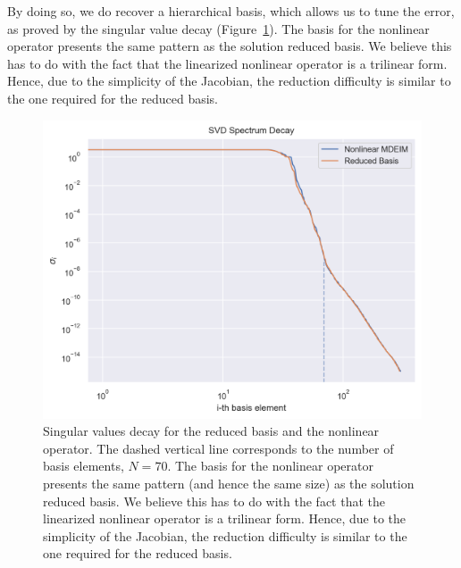 \documentclass[../../thesis.tex]{subfiles}
\begin{document}
By doing so, we do recover a hierarchical basis, which allows us to tune the error,
as proved by the singular value decay (Figure~\ref{fig:sigmas_decay_from_fom}).
The basis for the nonlinear operator presents the same pattern 
as the solution reduced basis.
We believe this has to do with the fact that the linearized nonlinear operator is a trilinear form.
Hence, due to the simplicity of the Jacobian, the reduction difficulty is similar to the one
required for the reduced basis.
\begin{figure}[h]
    \centering
    \includegraphics[width=1\columnwidth]{research_project/piston/figures/mdeim_certification/sigmas_problem_from_fom.png}
    \caption{Singular values decay for the reduced basis and the nonlinear operator.
    The dashed vertical line corresponds to the number of basis elements, $N=70$.
    The basis for the nonlinear operator presents the same pattern 
    (and hence the same size)
    as the solution reduced basis.
    We believe this has to do with the fact that the linearized nonlinear operator is a trilinear form.
    Hence, due to the simplicity of the Jacobian, the reduction difficulty is similar to the one
    required for the reduced basis.}
    \label{fig:sigmas_decay_from_fom}
\end{figure}
\end{document}
